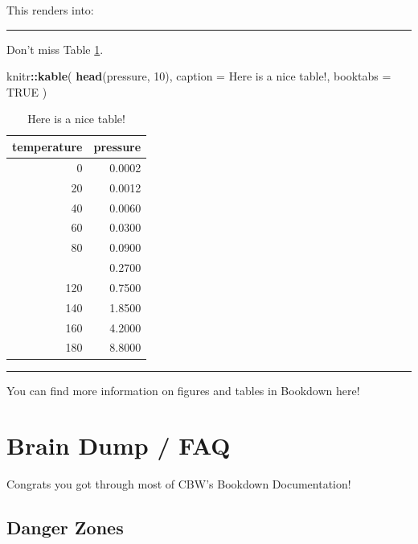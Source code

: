 \documentclass[
]{book}
\newenvironment{Shaded}{\begin{snugshade}}{\end{snugshade}}
\newcommand{\AttributeTok}[1]{\textcolor[rgb]{0.13,0.29,0.53}{#1}}
\newcommand{\ConstantTok}[1]{\textcolor[rgb]{0.56,0.35,0.01}{#1}}
\newcommand{\DecValTok}[1]{\textcolor[rgb]{0.00,0.00,0.81}{#1}}
\newcommand{\FunctionTok}[1]{\textcolor[rgb]{0.13,0.29,0.53}{\textbf{#1}}}
\newcommand{\NormalTok}[1]{#1}
\newcommand{\SpecialCharTok}[1]{\textcolor[rgb]{0.81,0.36,0.00}{\textbf{#1}}}
\newcommand{\StringTok}[1]{\textcolor[rgb]{0.31,0.60,0.02}{#1}}
\theoremstyle{definition}
\theoremstyle{definition}
\theoremstyle{definition}
\theoremstyle{definition}
\theoremstyle{remark}
\begin{document}
This renders into:

\begin{center}\rule{0.5\linewidth}{0.5pt}\end{center}

Don't miss Table \ref{tab:nice-tab}.

\begin{Shaded}
\begin{Highlighting}[]
\NormalTok{knitr}\SpecialCharTok{::}\FunctionTok{kable}\NormalTok{(}
  \FunctionTok{head}\NormalTok{(pressure, }\DecValTok{10}\NormalTok{), }\AttributeTok{caption =} \StringTok{\textquotesingle{}Here is a nice table!\textquotesingle{}}\NormalTok{,}
  \AttributeTok{booktabs =} \ConstantTok{TRUE}
\NormalTok{)}
\end{Highlighting}
\end{Shaded}

\begin{table}

\caption{\label{tab:nice-tab}Here is a nice table!}
\centering
\begin{tabular}[t]{rr}
\toprule
temperature & pressure\\
\midrule
0 & 0.0002\\
20 & 0.0012\\
40 & 0.0060\\
60 & 0.0300\\
80 & 0.0900\\
\addlinespace
100 & 0.2700\\
120 & 0.7500\\
140 & 1.8500\\
160 & 4.2000\\
180 & 8.8000\\
\bottomrule
\end{tabular}
\end{table}

\begin{center}\rule{0.5\linewidth}{0.5pt}\end{center}

You can find more information on figures and tables in Bookdown here!

\chapter{Brain Dump / FAQ}\label{help}

Congrats you got through most of CBW's Bookdown Documentation!

\section{Danger Zones}\label{danger-zones}
\end{document}

